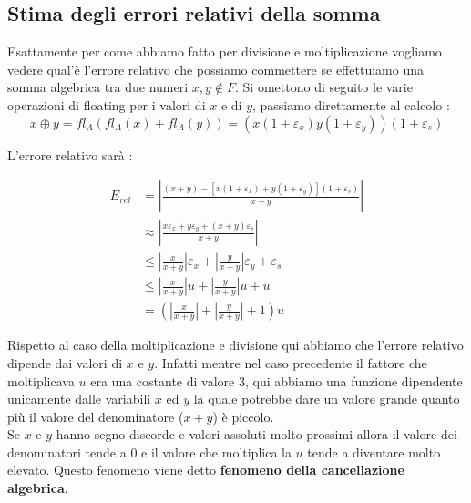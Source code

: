 \documentclass[12pt, a4paper]{book}
\theoremstyle{definition}
\begin{document}
\subsection{Stima degli errori relativi della somma}
\begin{flushleft}
Esattamente per come abbiamo fatto per divisione e moltiplicazione vogliamo vedere qual'è l'errore relativo che possiamo commettere se effettuiamo una somma algebrica tra due numeri $x,y \notin F$. 
Si omettono di seguito le varie operazioni di floating per i valori di $x$ e di $y$,  passiamo direttamente al calcolo : 
\[ x \oplus y = fl_{A}(fl_{A}(x) + fl_{A}(y)) = (x(1+\varepsilon_{x})y(1+\varepsilon_{y}))(1+\varepsilon_{s}) \]

L'errore relativo sarà : 

\begin{equation} \label{}
	\begin{split}
		E_{rel}  &=  \displaystyle\left\lvert \frac{(x+y) - [x(1+ \varepsilon_{x}) + y(1+\varepsilon_{y})](1+\varepsilon_{s}) }{x+y}   \right\rvert \\
					&\approx \displaystyle\left\lvert \frac{x\varepsilon_{x} + y\varepsilon_{y} + (x+y)\varepsilon_{s}}{x+y}   \right\rvert \\
					&\leq  \displaystyle\left\lvert \frac{x}{x+y} \right\rvert \varepsilon_{x } + \displaystyle\left\lvert \frac{y}{x+y} \right\rvert \varepsilon_{y} + \varepsilon_{s} \\
					&\leq \displaystyle\left\lvert \frac{x}{x+y} \right\rvert u + \displaystyle\left\lvert \frac{y}{x+y} \right\rvert u +  u\\
					&= \left( \displaystyle\left\lvert \frac{x}{x+y} \right\rvert +  \displaystyle\left\lvert \frac{y}{x+y} \right\rvert + 1 \right)u
	\end{split}
\end{equation}

Rispetto al caso della moltiplicazione e divisione qui abbiamo che l'errore relativo dipende dai valori di $x$ e $y$. Infatti mentre nel caso precedente il fattore che moltiplicava $u$ era una costante di valore 3, qui abbiamo una funzione dipendente unicamente dalle variabili $x$ ed $y$ la quale potrebbe dare un valore grande quanto più il valore del denominatore ($x+y$) è piccolo. \\
Se $x$ e $y$ hanno segno discorde e valori  assoluti molto prossimi allora il valore dei denominatori tende a 0 e il valore che moltiplica la $u$ tende a diventare molto elevato.
Questo fenomeno viene detto \textbf{fenomeno della cancellazione algebrica}.  
\end{flushleft}
\end{document}
